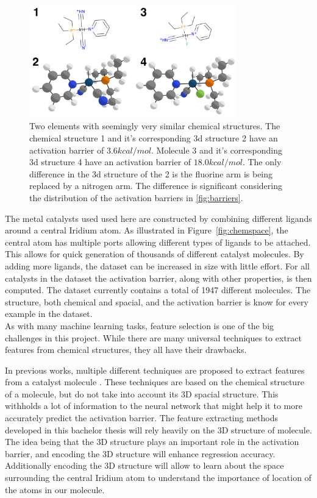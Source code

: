 \begin{figure}
  \centering
  \includegraphics[width=0.8\textwidth]{figures/introduction/elems_intro.png}
  \caption{Two elements with seemingly very similar chemical structures. The chemical structure 1 and it's corresponding 3d structure 2 have an activation barrier of $3.6 kcal/mol$.
  Molecule 3 and it's corresponding 3d structure 4 have an activation barrier of $18.0 kcal/mol$.
  The only difference in the 3d structure of the 2 is the fluorine arm is being replaced by a nitrogen arm.
  The difference is significant considering the distribution of the activation barriers in \ref{fig:barriers}.  }
  \label{fig:struct-diff}
\end{figure}


The metal catalysts used used here are constructed by combining different ligands around a central Iridium atom.
As illustrated in Figure~\ref{fig:chemspace}, the central atom has multiple ports allowing different types of ligands to be attached.  
This allows for quick generation of thousands of different catalyst molecules.
By adding more ligands, the dataset can be increased in size with little effort.
For all catalysts in the dataset the activation barrier, along with other properties, is then computed.
The dataset currently contains a total of 1947 different molecules.
The structure, both chemical and spacial, and the activation barrier is know for every example in the dataset. 
\\
As with many machine learning tasks, feature selection is one of the big challenges in this project.
While there are many universal techniques to extract features from chemical structures, they all have their drawbacks.

In previous works, multiple different techniques are proposed to extract features from a catalyst molecule \cite{friederich_dos}.
These techniques are based on the chemical structure of a molecule, but do not take into account its 3D spacial structure.
This withholds a lot of information to the neural network that might help it to more accurately predict the activation barrier.
The feature extracting methods developed in this bachelor thesis will rely heavily on the 3D structure of molecule.
The idea being that the 3D structure plays an important role in the activation barrier, and encoding the 3D structure will enhance regression accuracy.
Additionally encoding the 3D structure will allow to learn about the space surrounding the central 
Iridium atom to understand the importance of location of the atoms in our molecule.

